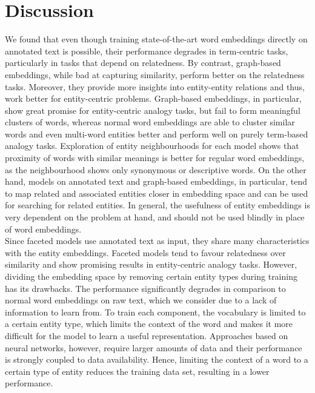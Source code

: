 \section{Discussion}
We found that even though training state-of-the-art word embeddings directly on annotated text is possible, their performance degrades in term-centric tasks, particularly in tasks that depend on relatedness. By contrast, graph-based embeddings, while bad at capturing similarity, perform better on the relatedness tasks. Moreover, they provide more insights into entity-entity relations and thus, work better for entity-centric problems. Graph-based embeddings, in particular, show great promise for entity-centric analogy tasks, but fail to form meaningful clusters of words, whereas normal word embeddings are able to cluster similar words and even multi-word entities better and perform well on purely term-based analogy tasks. Exploration of entity neighbourhoods for each model shows that proximity of words with similar meanings is better for regular word embeddings, as the neighbourhood shows only synonymous or descriptive words.
On the other hand, models on annotated text and graph-based embeddings, in particular, tend to map related and associated entities closer in embedding space and can be used for searching for related entities. In general, the usefulness of entity embeddings is very dependent on the problem at hand, and should not be used blindly in place of word embeddings.
\\
Since faceted models use annotated text as input, they share many characteristics with the entity embeddings. Faceted models tend to favour relatedness over similarity and show promising results in entity-centric analogy tasks. However, dividing the embedding space by removing certain entity types during training has its drawbacks. The performance significantly degrades in comparison to normal word embeddings on raw text, which we consider due to a lack of information to learn from. To train each component, the vocabulary is limited to a certain entity type, which limits the context of the word and makes it more difficult for the model to learn a useful representation. Approaches based on neural networks, however, require larger amounts of data and their performance is strongly coupled to data availability. Hence, limiting the context of a word to a certain type of entity reduces the training data set, resulting in a lower performance.
